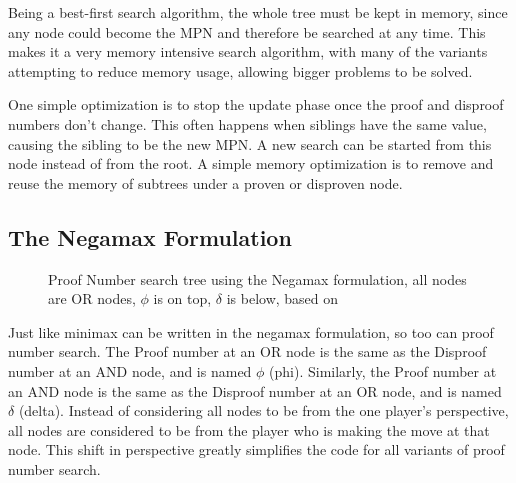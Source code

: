 Being a best-first search algorithm, the whole tree must be kept in memory, since any node could become the MPN and therefore be searched at any time. This makes it a very memory intensive search algorithm, with many of the variants attempting to reduce memory usage, allowing bigger problems to be solved.

One simple optimization is to stop the update phase once the proof and disproof numbers don't change. This often happens when siblings have the same value, causing the sibling to be the new MPN. A new search can be started from this node instead of from the root. A simple memory optimization is to remove and reuse the memory of subtrees under a proven or disproven node.

\subsection{The Negamax Formulation} \label{sec:NegaPDS}

\begin{figure}
\centering
{}
\caption{Proof Number search tree using the Negamax formulation, all nodes are OR nodes, $\phi$ is on top, $\delta$ is below, based on \cite{winands2003-PDS-PN}}
\label{fig:negamaxtree}
\end{figure}

Just like minimax can be written in the negamax formulation, so too can proof number search. The Proof number at an OR node is the same as the Disproof number at an AND node, and is named $\phi$ (phi). Similarly, the Proof number at an AND node is the same as the Disproof number at an OR node, and is named $\delta$ (delta). Instead of considering all nodes to be from the one player's perspective, all nodes are considered to be from the player who is making the move at that node. This shift in perspective greatly simplifies the code for all variants of proof number search.

